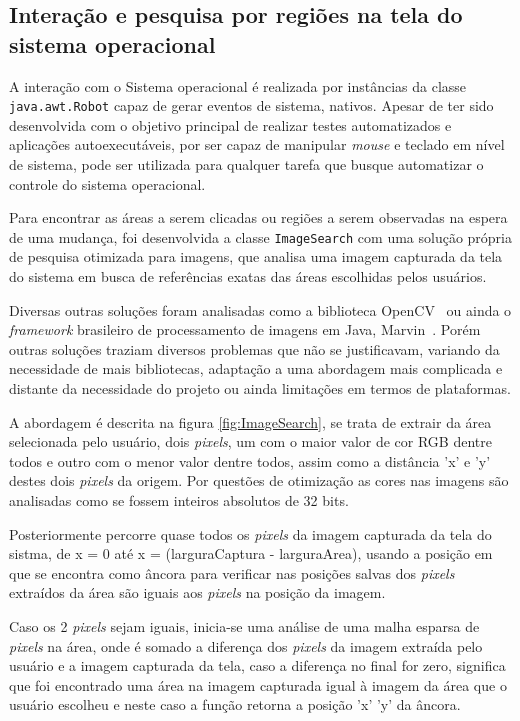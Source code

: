 \documentclass[tg]{mdtufsm}
\begin{document}
                \subsection {Interação e pesquisa por regiões na tela do sistema operacional}

                A interação com o Sistema operacional é realizada por instâncias da classe \texttt{java.awt.Robot} capaz de gerar eventos de sistema, nativos. Apesar de ter sido desenvolvida com o objetivo principal de realizar testes automatizados e aplicações autoexecutáveis, por ser capaz de manipular \emph{mouse} e teclado em nível de sistema, pode ser utilizada para qualquer tarefa que busque automatizar o controle do sistema operacional.

                Para encontrar as áreas a serem clicadas ou regiões a serem observadas na espera de uma mudança, foi desenvolvida a classe \texttt{ImageSearch} com uma solução própria de pesquisa otimizada para imagens, que analisa uma imagem capturada da tela do sistema em busca de referências exatas das áreas escolhidas pelos usuários.

                Diversas outras soluções foram analisadas como a biblioteca OpenCV~\cite{openCV} ou ainda o \emph{framework} brasileiro de processamento de imagens em Java, Marvin~\cite{marvin}. Porém outras soluções traziam diversos problemas que não se justificavam, variando da necessidade de mais bibliotecas, adaptação a uma abordagem mais complicada e distante da necessidade do projeto ou ainda limitações em termos de plataformas.

                A abordagem é descrita na figura \ref{fig:ImageSearch}, se trata de extrair da área selecionada pelo usuário, dois \emph{pixels}, um com o maior valor de cor RGB dentre todos e outro com o menor valor dentre todos, assim como a distância 'x' e 'y' destes dois \emph{pixels} da origem. Por questões de otimização as cores nas imagens são analisadas como se fossem inteiros absolutos de 32 bits.

                Posteriormente percorre quase todos os \emph{pixels} da imagem capturada da tela do sistma, de x = 0 até x = (larguraCaptura - larguraArea), usando a posição em que se encontra como âncora para verificar nas posições salvas dos \emph{pixels} extraídos da área são iguais aos \emph{pixels} na posição da imagem.

                Caso os 2 \emph{pixels} sejam iguais, inicia-se uma análise de uma malha esparsa de \emph{pixels} na área, onde é somado a diferença dos \emph{pixels} da imagem extraída pelo usuário e a imagem capturada da tela, caso a diferença no final for zero, significa que foi encontrado uma área na imagem capturada igual à imagem da área que o usuário escolheu e neste caso a função retorna a posição 'x' 'y' da âncora.
\end{document}
